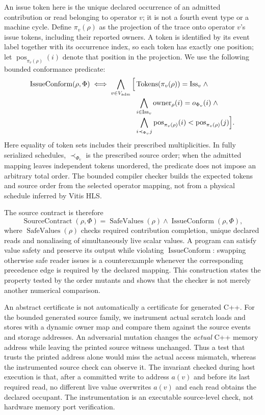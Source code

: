 \documentclass{article}
\begin{document}
An issue token here is the unique declared occurrence of an admitted contribution or read belonging to operator $v$; it is not a fourth event type or a machine cycle. Define $\pi_v(\rho)$ as the projection of the trace onto operator $v$'s issue tokens, including their reported owners. A token is identified by its event label together with its occurrence index, so each token has exactly one position; let $\operatorname{pos}_{\pi_v(\rho)}(i)$ denote that position in the projection. We use the following bounded conformance predicate:
\begin{align}
\operatorname{IssueConform}(\rho,\Phi)\;\Longleftrightarrow\;
\bigwedge_{v\in V_{\mathrm{adm}}}\Big[&
\operatorname{Tokens}(\pi_v(\rho))=\mathrm{Iss}_v\;\wedge\label{eq:issue-conform}\\[-2pt]
&\bigwedge_{i\in\mathrm{Iss}_v}\operatorname{owner}_\rho(i)=o_{\Phi_v}(i)\;\wedge\notag\\[-2pt]
&\bigwedge_{i\prec_{\Phi_v}j}
\operatorname{pos}_{\pi_v(\rho)}(i)<\operatorname{pos}_{\pi_v(\rho)}(j)\Big].\notag
\end{align}
Here equality of token sets includes their prescribed multiplicities. In fully serialized schedules, $\prec_{\Phi_v}$ is the prescribed source order; when the admitted mapping leaves independent tokens unordered, the predicate does not impose an arbitrary total order. The bounded compiler checker builds the expected tokens and source order from the selected operator mapping, not from a physical schedule inferred by Vitis HLS.

The source contract is therefore
\begin{equation}
\operatorname{SourceContract}(\rho,\Phi)
=\operatorname{SafeValues}(\rho)\land\operatorname{IssueConform}(\rho,\Phi),
\label{eq:contract}
\end{equation}
where $\operatorname{SafeValues}(\rho)$ checks required contribution completion, unique declared reads and nonaliasing of simultaneously live scalar values. A program can satisfy value safety and preserve its output while violating $\operatorname{IssueConform}$: swapping otherwise safe reader issues is a counterexample whenever the corresponding precedence edge is required by the declared mapping. This construction states the property tested by the order mutants and shows that the checker is not merely another numerical comparison.


An abstract certificate is not automatically a certificate for generated C++. For the bounded generated source family, we instrument actual scratch loads and stores with a dynamic owner map and compare them against the source events and storage addresses. An adversarial mutation changes the \emph{actual} C++ memory address while leaving the printed source witness unchanged. Thus a test that trusts the printed address alone would miss the actual access mismatch, whereas the instrumented source check can observe it. The invariant checked during host execution is that, after a committed write to address $a(v)$ and before its last required read, no different live value overwrites $a(v)$ and each read obtains the declared occupant. The instrumentation is an executable source-level check, not hardware memory port verification.
\end{document}
